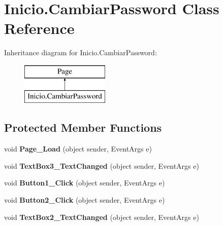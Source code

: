 \hypertarget{class_inicio_1_1_cambiar_password}{}\section{Inicio.\+Cambiar\+Password Class Reference}
\label{class_inicio_1_1_cambiar_password}
Inheritance diagram for Inicio.\+Cambiar\+Password\+:\begin{figure}[H]
\begin{center}
\leavevmode
\includegraphics[height=2.000000cm]{class_inicio_1_1_cambiar_password}
\end{center}
\end{figure}
\subsection*{Protected Member Functions}
\begin{DoxyCompactItemize}
\item 
\mbox{\label{class_inicio_1_1_cambiar_password_a94a3066835d069fa7b90f66f6f526ac3}} 
void {\bfseries Page\+\_\+\+Load} (object sender, Event\+Args e)
\item 
\mbox{\label{class_inicio_1_1_cambiar_password_a51ae5ea82fb81cd914f095420908a5e4}} 
void {\bfseries Text\+Box3\+\_\+\+Text\+Changed} (object sender, Event\+Args e)
\item 
\mbox{\label{class_inicio_1_1_cambiar_password_a59bb43a3c0865c4c403c30cf49bc5381}} 
void {\bfseries Button1\+\_\+\+Click} (object sender, Event\+Args e)
\item 
\mbox{\label{class_inicio_1_1_cambiar_password_aec4c171949c854275a9dd38e949cb62e}} 
void {\bfseries Button2\+\_\+\+Click} (object sender, Event\+Args e)
\item 
\mbox{\label{class_inicio_1_1_cambiar_password_abfdeff9b67fcd55ac193f7e51ddbbeb6}} 
void {\bfseries Text\+Box2\+\_\+\+Text\+Changed} (object sender, Event\+Args e)
\end{DoxyCompactItemize}
